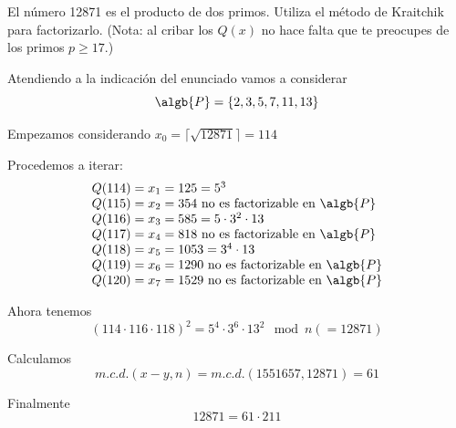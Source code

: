 \begin{problem}[7]
El número 12871 es el producto de dos
primos. Utiliza el método de Kraitchik para factorizarlo.
(Nota: al cribar los $Q(x)$ no hace falta que te preocupes de los
primos $p\ge 17$.)
\solution


Atendiendo a la indicación del enunciado vamos a considerar
\[\algb{P} = \{2,3,5,7,11,13\}\]

Empezamos considerando $x_0 = \lceil \sqrt{12871} \rceil=114$

Procedemos a iterar:
\[\begin{array}{l}
Q(114) = x_1 = 125 = 5^3\\
Q(115) = x_2 = 354 \text{ no es factorizable en } \algb{P} \\
Q(116) = x_3 = 585 = 5 \cdot 3^2 \cdot 13 \\
Q(117) = x_4 = 818 \text{ no es factorizable en } \algb{P} \\
Q(118) = x_5 = 1053 = 3^4 \cdot 13 \\
Q(119) = x_6 = 1290 \text{ no es factorizable en } \algb{P}\\
Q(120) = x_7 = 1529 \text{ no es factorizable en } \algb{P}
\end{array}\]

Ahora tenemos
\[(114 \cdot 116 \cdot 118)^2 = 5^4 \cdot 3^6 \cdot 13^2 \mod n (=12871)\]

Calculamos
\[m.c.d.(x-y,n) = m.c.d.(1551657,12871)= 61 \]

Finalmente
\[12871 = 61 \cdot 211 \]
\end{problem}


